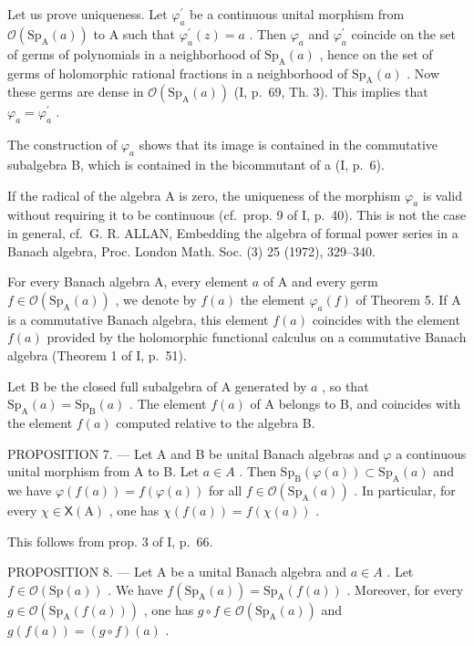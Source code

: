 Let us prove uniqueness. Let \(\varphi_{a}^{\prime}\) be a continuous unital morphism from \(\mathcal{O}(\mathrm{Sp}_{\mathrm{A}}(a))\) to A such that \(\varphi_{a}^{\prime}(z)=a\) . Then \(\varphi_{a}\) and \(\varphi_{a}^{\prime}\) coincide on the set of germs of polynomials in a neighborhood of \(\mathrm{Sp}_{\mathrm{A}}(a)\) , hence on the set of germs of holomorphic rational fractions in a neighborhood of \(\mathrm{Sp}_{\mathrm{A}}(a)\) . Now these germs are dense in \(\mathcal{O}(\mathrm{Sp}_{\mathrm{A}}(a))\) (I, p.~69, Th. 3). This implies that \(\varphi_{a}=\varphi_{a}^{\prime}\) .

The construction of \(\varphi_{a}\) shows that its image is contained in the commutative subalgebra B, which is contained in the bicommutant of a (I, p.~6).

If the radical of the algebra A is zero, the uniqueness of the morphism \(\varphi_{a}\) is valid without requiring it to be continuous (cf.~prop. 9 of I, p.~40). This is not the case in general, cf.~G. R. ALLAN, Embedding the algebra of formal power series in a Banach algebra, Proc. London Math. Soc. (3) 25 (1972), 329--340.

For every Banach algebra A, every element \(a\) of A and every germ \(f \in \mathcal{O}(\mathrm{Sp}_{\mathrm{A}}(a))\) , we denote by \(f(a)\) the element \(\varphi_{a}(f)\) of Theorem 5. If A is a commutative Banach algebra, this element \(f(a)\) coincides with the element \(f(a)\) provided by the holomorphic functional calculus on a commutative Banach algebra (Theorem 1 of I, p.~51).

Let B be the closed full subalgebra of A generated by \(a\) , so that \(\mathrm{Sp}_{\mathrm{A}}(a) = \mathrm{Sp}_{\mathrm{B}}(a)\) . The element \(f(a)\) of A belongs to B, and coincides with the element \(f(a)\) computed relative to the algebra B.

PROPOSITION 7. --- Let A and B be unital Banach algebras and \(\varphi\) a continuous unital morphism from A to B. Let \(a \in A\) . Then \(\mathrm{Sp}_{\mathrm{B}}(\varphi(a)) \subset \mathrm{Sp}_{\mathrm{A}}(a)\) and we have \(\varphi(f(a)) = f(\varphi(a))\) for all \(f \in \mathcal{O}(\mathrm{Sp}_{\mathrm{A}}(a))\) . In particular, for every \(\chi \in \mathsf{X}(\mathrm{A})\) , one has \(\chi(f(a)) = f(\chi(a))\) .

This follows from prop. 3 of I, p.~66.

PROPOSITION 8. --- Let A be a unital Banach algebra and \(a \in A\) . Let \(f \in \mathcal{O}(\mathrm{Sp}(a))\) . We have \(f(\mathrm{Sp}_{\mathrm{A}}(a)) = \mathrm{Sp}_{\mathrm{A}}(f(a))\) . Moreover, for every \(g \in \mathcal{O}(\mathrm{Sp}_{\mathrm{A}}(f(a)))\) , one has \(g \circ f \in \mathcal{O}(\mathrm{Sp}_{\mathrm{A}}(a))\) and \(g(f(a)) = (g \circ f)(a)\) .


